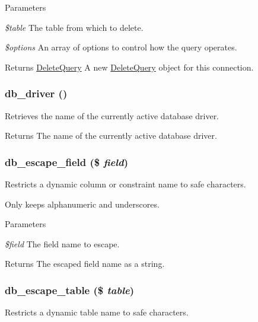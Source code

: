 \begin{DoxyParams}{Parameters}
\item[{\em \$table}]The table from which to delete. \item[{\em \$options}]An array of options to control how the query operates.\end{DoxyParams}
\begin{DoxyReturn}{Returns}
\hyperlink{classDeleteQuery}{DeleteQuery} A new \hyperlink{classDeleteQuery}{DeleteQuery} object for this connection. 
\end{DoxyReturn}
\hypertarget{group__database_gabf958ef859f66154f7fd705eda7a06af}{
\subsubsection[{db\_\-driver}]{\setlength{\rightskip}{0pt plus 5cm}db\_\-driver ()}}
\label{group__database_gabf958ef859f66154f7fd705eda7a06af}
Retrieves the name of the currently active database driver.

\begin{DoxyReturn}{Returns}
The name of the currently active database driver. 
\end{DoxyReturn}
\hypertarget{group__database_ga7e3c82a45a3e894ce2b4a5a37fa69246}{
\subsubsection[{db\_\-escape\_\-field}]{\setlength{\rightskip}{0pt plus 5cm}db\_\-escape\_\-field (\$ {\em field})}}
\label{group__database_ga7e3c82a45a3e894ce2b4a5a37fa69246}
Restricts a dynamic column or constraint name to safe characters.

Only keeps alphanumeric and underscores.


\begin{DoxyParams}{Parameters}
\item[{\em \$field}]The field name to escape.\end{DoxyParams}
\begin{DoxyReturn}{Returns}
The escaped field name as a string. 
\end{DoxyReturn}
\hypertarget{group__database_ga3bc27db8c5946da0cab63d9b6314d48d}{
\subsubsection[{db\_\-escape\_\-table}]{\setlength{\rightskip}{0pt plus 5cm}db\_\-escape\_\-table (\$ {\em table})}}
\label{group__database_ga3bc27db8c5946da0cab63d9b6314d48d}
Restricts a dynamic table name to safe characters.

